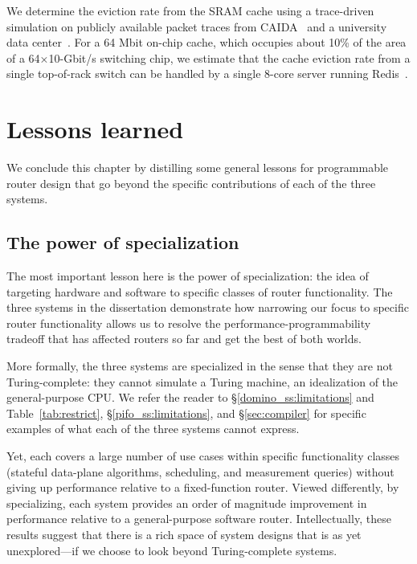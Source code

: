  We determine the eviction rate from the SRAM cache using a trace-driven
simulation on publicly available packet traces from CAIDA~\cite{caida2016,
caida2014} and a university data center~\cite{theo_dc}. For a 64 Mbit on-chip
cache, which occupies about 10\% of the area of a 64×10-Gbit/s switching chip,
we estimate that the cache eviction rate from a single top-of-rack switch can
be handled by a single 8-core server running Redis~\cite{redis}.

\section{Lessons learned} We conclude this chapter by distilling some general
lessons for programmable router design that go beyond the specific
contributions of each of the three systems.

\subsection{The power of specialization} The most important lesson here is the
power of specialization: the idea of targeting hardware and software to
specific classes of router functionality.  The three systems in the
dissertation demonstrate how narrowing our focus to specific router
functionality allows us to resolve the performance-programmability tradeoff
that has affected routers so far and get the best of both worlds.

More formally, the three systems are specialized in the sense that they are not
Turing-complete: they cannot simulate a Turing machine, an idealization of the
general-purpose CPU.  We refer the reader to \S\ref{domino_ss:limitations} and
Table~\ref{tab:restrict}, \S\ref{pifo_ss:limitations}, and \S\ref{sec:compiler}
for specific examples of what each of the three systems cannot express.

Yet, each covers a large number of use cases within specific functionality
classes (stateful data-plane algorithms, scheduling, and measurement queries)
without giving up performance relative to a fixed-function router. Viewed
differently, by specializing, each system provides an order of magnitude
improvement in performance relative to a general-purpose software router.
Intellectually, these results suggest that there is a rich space of system
designs that is as yet unexplored---if we choose to look beyond Turing-complete
systems. 

